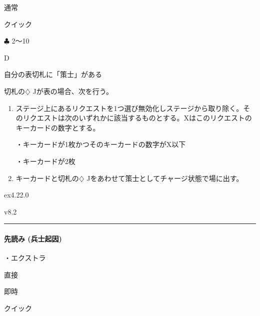 \documentclass[letterpaper,10pt,dvipdfmx]{sphinxmanual}
\begin{document}
\sphinxAtStartPar
{} 通常

\sphinxAtStartPar
{} クイック

\sphinxAtStartPar
{} {\normalsize $\clubsuit$} 2〜10

\sphinxAtStartPar
{} D

\sphinxAtStartPar
{}

\sphinxAtStartPar
自分の表切札に「策士」がある

\sphinxAtStartPar
{}

\sphinxAtStartPar
切札の{\normalsize $\diamondsuit$} Jが表の場合、次を行う。
\begin{enumerate}
%
\item {} 
\sphinxAtStartPar
ステージ上にあるリクエストを1つ選び無効化しステージから取り除く。そのリクエストは次のいずれかに該当するものとする。Xはこのリクエストのキーカードの数字とする。

\sphinxAtStartPar
・キーカードが1枚かつそのキーカードの数字がX以下

\sphinxAtStartPar
・キーカードが2枚

\item {} 
\sphinxAtStartPar
キーカードと切札の{\normalsize $\diamondsuit$} Jをあわせて策士としてチャージ状態で場に出す。

\end{enumerate}

\sphinxAtStartPar
{}  ex4.22.0

\sphinxAtStartPar
{}  v8.2


\bigskip\hrule\bigskip



\paragraph{先読み (兵士起因)}
\label{\detokenize{auto/frameActionlist:act-strategistpredict}}\label{\detokenize{auto/frameActionlist:id67}}
\sphinxAtStartPar
{}

\sphinxAtStartPar
・エクストラ

\sphinxAtStartPar
{} 直接

\sphinxAtStartPar
{} 即時

\sphinxAtStartPar
{} クイック
\end{document}
